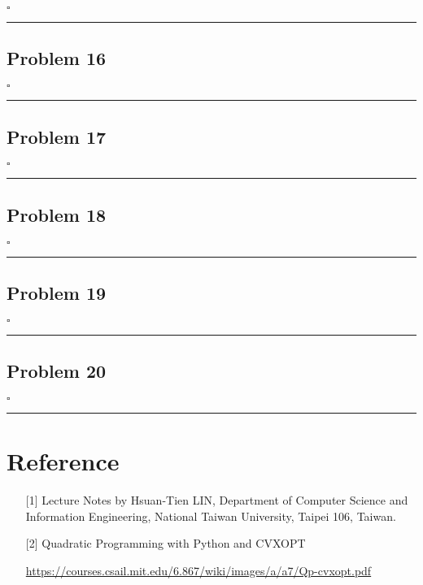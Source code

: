 \documentclass[12pt]{article}
\newcommand*{\QEDB}{\hfill\ensuremath{\square}}
\newcommand{\horrule}[1]{\rule{\linewidth}{#1}}
\begin{document}
\QEDB

\horrule{0.5pt}

\subsection*{Problem 16}

\QEDB

\horrule{0.5pt}

\subsection*{Problem 17}

\QEDB

\horrule{0.5pt}

\subsection*{Problem 18}

\QEDB

\horrule{0.5pt}

\subsection*{Problem 19}

\QEDB

\horrule{0.5pt}

\subsection*{Problem 20}

\QEDB

\horrule{0.5pt}

\section*{Reference}

\begin{enumerate}

\item[{[1]}] Lecture Notes by Hsuan-Tien LIN, Department of Computer Science and Information Engineering, National Taiwan University, Taipei 106, Taiwan.

\item[{[2]}] Quadratic Programming with Python and CVXOPT

\url{https://courses.csail.mit.edu/6.867/wiki/images/a/a7/Qp-cvxopt.pdf}

\end{enumerate}
\end{document}

